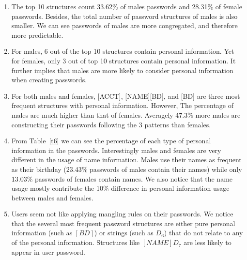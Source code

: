 \documentclass{sig-alternate}
\begin{document}
\begin{enumerate}[leftmargin=*]
\item The top 10 structures count 33.62\% of males passwords and 28.31\% of female passwords. Besides, the total number of password structures of males is also smaller. We can see passwords of males are more congregated, and therefore more predictable. 
\item For males, 6 out of the top 10 structures contain personal information. Yet for females, only 3 out of top 10 structures contain personal information. It further implies that males are more likely to consider personal information when creating passwords.
\item For both males and females, [ACCT], [NAME][BD], and [BD] are three most frequent structures with personal information. However, The percentage of males are much higher than that of females. Averagely 47.3\% more males are constructing their passwords following the 3 patterns than females.
\item From Table~\ref{t6} we can see the percentage of each type of personal information in the passwords. Interestingly males and females are very different in the usage of name information. Males use their names as frequent as their birthday (23.43\% passwords of males contain their names) while only 13.03\% passwords of females contain names. We also notice that the name usage mostly contribute the 10\% difference in personal information usage between males and females. 
\item Users seem not like applying mangling rules on their passwords. We notice that the several most frequent password structures are either pure personal information (such as $[BD]$) or strings (such as $D_6$) that do not relate to any of the personal information. Structures like $[NAME]D_7$ are less likely to appear in user password.

\end{enumerate} 
\end{document}
